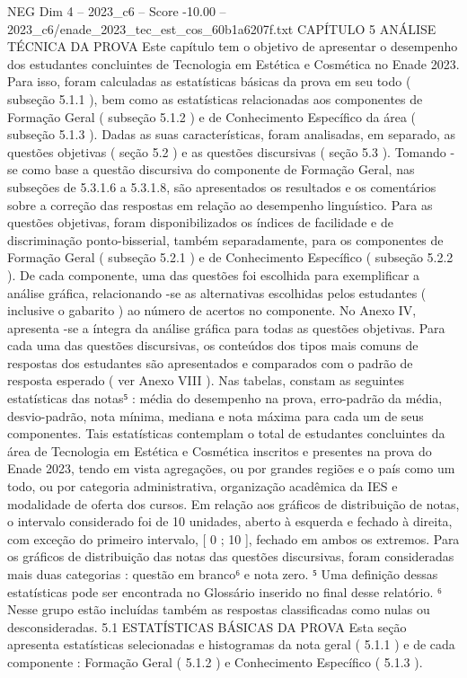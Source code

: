 \begin{textsample}{NEG Dim 4 – 2023\_c6 – Score -10.00 – 2023\_c6/enade\_2023\_tec\_est\_cos\_60b1a6207f.txt}  \label{ex:f4_neg_002}
CAPÍTULO 5 ANÁLISE TÉCNICA DA PROVA Este capítulo tem o objetivo de apresentar o desempenho dos estudantes concluintes de Tecnologia em Estética e Cosmética no Enade 2023.
Para isso, foram calculadas as estatísticas básicas da prova em seu todo ( subseção 5.1.1 ), bem como as estatísticas relacionadas aos componentes de Formação Geral ( subseção 5.1.2 ) e de Conhecimento Específico da área ( subseção 5.1.3 ).
Dadas as suas características, foram analisadas, em separado, as questões objetivas ( seção 5.2 ) e as questões discursivas ( seção 5.3 ).
Tomando -se como base a questão discursiva do componente de Formação Geral, nas subseções de 5.3.1.6 a 5.3.1.8, são apresentados os resultados e os comentários sobre a correção das respostas em relação ao desempenho linguístico.
Para as questões objetivas, foram disponibilizados os índices de facilidade e de discriminação ponto-bisserial, também separadamente, para os componentes de Formação Geral ( subseção 5.2.1 ) e de Conhecimento Específico ( subseção 5.2.2 ).
De cada componente, uma das questões foi escolhida para exemplificar a análise gráfica, relacionando -se as alternativas escolhidas pelos estudantes ( inclusive o gabarito ) ao número de acertos no componente.
No Anexo IV, apresenta -se a íntegra da análise gráfica para todas as questões objetivas.
Para cada uma das questões discursivas, os conteúdos dos tipos mais comuns de respostas dos estudantes são apresentados e comparados com o padrão de resposta esperado ( ver Anexo VIII ).
Nas tabelas, constam as seguintes estatísticas das notas⁵ : média do desempenho na prova, erro-padrão da média, desvio-padrão, nota mínima, mediana e nota máxima para cada um de seus componentes.
Tais estatísticas contemplam o total de estudantes concluintes da área de Tecnologia em Estética e Cosmética inscritos e presentes na prova do Enade 2023, tendo em vista agregações, ou por grandes regiões e o país como um todo, ou por categoria administrativa, organização acadêmica da IES e modalidade de oferta dos cursos.
Em relação aos gráficos de distribuição de notas, o intervalo considerado foi de 10 unidades, aberto à esquerda e fechado à direita, com exceção do primeiro intervalo, [ 0 ; 10 ], fechado em ambos os extremos.
Para os gráficos de distribuição das notas das questões discursivas, foram consideradas mais duas categorias : questão em branco⁶ e nota zero. ⁵ Uma definição dessas estatísticas pode ser encontrada no Glossário inserido no final desse relatório. ⁶ Nesse grupo estão incluídas também as respostas classificadas como nulas ou desconsideradas. 5.1 ESTATÍSTICAS BÁSICAS DA PROVA Esta seção apresenta estatísticas selecionadas e histogramas da nota geral ( 5.1.1 ) e de cada componente : Formação Geral ( 5.1.2 ) e Conhecimento Específico ( 5.1.3 ).

\end{textsample}
